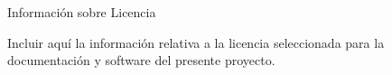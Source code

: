 
 \begin{center}

       Información sobre Licencia


\end{center}

Incluir aquí la información relativa a la licencia seleccionada para la documentación y software del presente proyecto.
